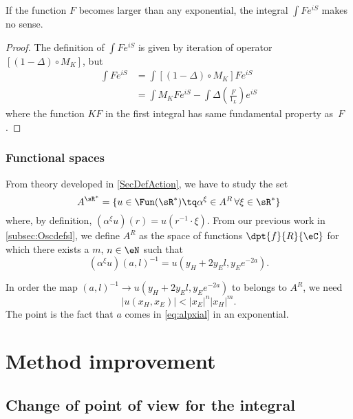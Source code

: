 \begin{lemma}
If the function $F$ becomes larger than any exponential, the integral $\int F e^{iS}$ makes no sense.
\end{lemma}


\begin{proof}
The definition of $\int F e^{iS}$ is given by iteration of operator $[(1-\Delta)\circ M_K]$, but
\begin{equation}
\begin{split}
\int F e^{iS}&=\int [(1-\Delta)\circ M_K]F e^{iS}\\
		&=\int M_KF e^{iS}-\int \Delta\left( \frac{F}{1_L} \right) e^{iS}
\end{split}
\end{equation}
where the function $KF$ in the first integral has same fundamental property as~$F$.
\end{proof}


\subsubsection{Functional spaces}

From theory developed in \ref{SecDefAction}, we have to study the set
\[ 
  A^{\sR^*}=\{ u\in\Fun(\sR^*)\tq \alpha^{\xi}\in A^R\,\forall \xi\in\sR^* \}
\]
where, by definition, $(\alpha^{\xi}u)(r)=u(r^{-1}\cdot\xi)$. From our previous work in \ref{subsec:Oscdefsl}, we define $A^R$ as the space of functions $\dpt{f}{R}{\eC}$ for which there exists a $m$, $n\in\eN$ such that
\begin{equation}  \label{eq:alpxial}
  (\alpha^{\xi}u)(a,l)^{-1}=u(y_H+2y_El,y_Ee^{-2a}).
\end{equation}

In order the map $(a,l)^{-1}\to u(y_H+2y_El,y_Ee^{-2a})$ to belongs to $A^R$, we need
\begin{equation}
   | u(x_H,x_E) |< | x_E |^n| x_H |^m.
\end{equation}
The point is the fact that $a$ comes in \eqref{eq:alpxial} in an exponential. 

\section{Method improvement}

\subsection{Change of point of view for the integral}


